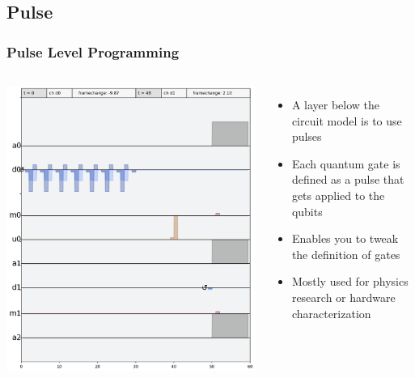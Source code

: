 \documentclass[aspectratio=169,11pt,hyperref={colorlinks=true}]{beamer}
\begin{document}
\subsection{Pulse}
\begin{frame}
    \frametitle{Pulse Level Programming}
    \begin{columns}
            \includegraphics[width=\textwidth]{bell-sched.png}
            \begin{itemize}
                \item A layer below the circuit model is to use pulses
                \item Each quantum gate is defined as a pulse that gets
                    applied to the qubits
                \item Enables you to tweak the definition of gates
                \item Mostly used for physics research or hardware characterization
            \end{itemize}
    \end{columns}
\end{frame}
\end{document}

